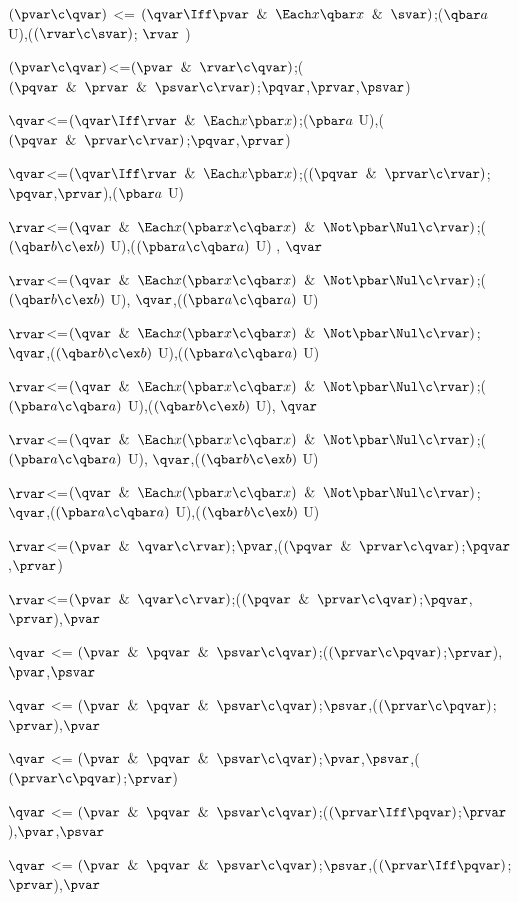 $(\pvar \c \qvar )$ <= $(\qvar \Iff \pvar \And\Each x \qbar x \And \svar)$;($\qbar a$ U),($(\rvar \c \svar)$; $\rvar$ )

$(\pvar \c \qvar)$<=$(\pvar \And \rvar \c \qvar)$;($(\pqvar \And\prvar \And \psvar\c \rvar)$;$\pqvar$,$\prvar$,$\psvar$)

$\qvar$<=$(\qvar \Iff \rvar \And \Each x \pbar x)$;($\pbar a$ U),($(\pqvar \And \prvar \c\rvar)$;$\pqvar$,$\prvar$)

$\qvar$<=$(\qvar \Iff \rvar \And \Each x \pbar x)$;($(\pqvar \And \prvar \c\rvar)$;$\pqvar$,$\prvar$),($\pbar a$ U)

$\rvar$<=$(\qvar\And\Each x(\pbar x \c\qbar x)\And \Not\pbar\Nul\c\rvar)$;($(\qbar b \c \ex b)$ U),($ (\pbar a \c \qbar a)$ U) , $\qvar$

$\rvar$<=$(\qvar\And\Each x(\pbar x \c\qbar x)\And \Not\pbar\Nul\c\rvar)$;($(\qbar b \c \ex b)$ U), $\qvar$,($ (\pbar a \c \qbar a)$ U)

$\rvar$<=$(\qvar\And\Each x(\pbar x \c\qbar x)\And \Not\pbar\Nul\c\rvar)$; $\qvar$,($(\qbar b \c \ex b)$ U),($ (\pbar a \c \qbar a)$ U)

$\rvar$<=$(\qvar\And\Each x(\pbar x \c\qbar x)\And \Not\pbar\Nul\c\rvar)$;($ (\pbar a \c \qbar a)$ U),($(\qbar b \c \ex b)$ U), $\qvar$

$\rvar$<=$(\qvar\And\Each x(\pbar x \c\qbar x)\And \Not\pbar\Nul\c\rvar)$;($ (\pbar a \c \qbar a)$ U), $\qvar$,($(\qbar b \c \ex b)$ U)

$\rvar$<=$(\qvar\And\Each x(\pbar x \c\qbar x)\And \Not\pbar\Nul\c\rvar)$; $\qvar$,($ (\pbar a \c \qbar a)$ U),($(\qbar b \c \ex b)$ U)

$\rvar$<=$(\pvar \And \qvar \c \rvar)$;$\pvar$,($(\pqvar \And \prvar \c \qvar)$;$\pqvar$,$\prvar$)

$\rvar$<=$(\pvar \And \qvar \c \rvar)$;($(\pqvar \And \prvar \c \qvar)$;$\pqvar$,$\prvar$),$\pvar$

$\qvar$ <= $(\pvar \And \pqvar \And \psvar\c \qvar)$;($(\prvar \c \pqvar)$;$\prvar$),$\pvar$,$\psvar$

$\qvar$ <= $(\pvar \And \pqvar \And \psvar\c \qvar)$;$\psvar$,($(\prvar \c \pqvar)$;$\prvar$),$\pvar$

$\qvar$ <= $(\pvar \And \pqvar \And \psvar\c \qvar)$;$\pvar$,$\psvar$,($(\prvar \c \pqvar)$;$\prvar$)

$\qvar$ <= $(\pvar \And \pqvar \And \psvar\c \qvar)$;($(\prvar \Iff \pqvar)$;$\prvar$),$\pvar$,$\psvar$

$\qvar$ <= $(\pvar \And \pqvar \And \psvar\c \qvar)$;$\psvar$,($(\prvar \Iff \pqvar)$;$\prvar$),$\pvar$

